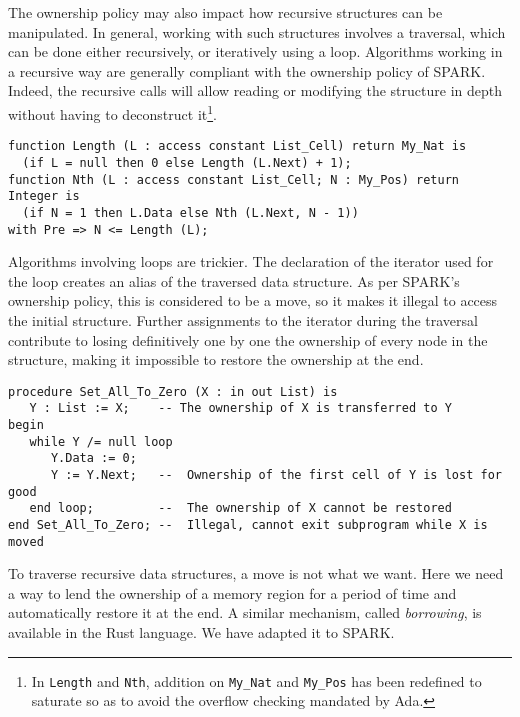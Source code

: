 \documentclass[runningheads]{llncs}
\begin{document}
The ownership policy may also impact how recursive structures can be manipulated. In general, working with such structures involves a traversal, which can be done either recursively, or iteratively using a loop. Algorithms working in a recursive way are generally compliant with the ownership policy of SPARK. Indeed, the recursive calls will allow reading or modifying the structure in depth without having to deconstruct it\footnote{In \texttt{Length} and \texttt{Nth}, addition on \texttt{My\_Nat} and \texttt{My\_Pos} has been redefined to saturate so as to avoid the overflow checking mandated by Ada.}.
\begin{lstlisting}
function Length (L : access constant List_Cell) return My_Nat is
  (if L = null then 0 else Length (L.Next) + 1);
function Nth (L : access constant List_Cell; N : My_Pos) return Integer is
  (if N = 1 then L.Data else Nth (L.Next, N - 1))
with Pre => N <= Length (L);
\end{lstlisting}
Algorithms involving loops are trickier. The declaration of the iterator used for the loop creates an alias of the traversed data structure. As per SPARK's ownership policy, this is considered to be a move, so it makes it illegal to access the initial structure. Further assignments to the iterator during the traversal contribute to losing definitively one by one the ownership of every node in the structure, making it impossible to restore the ownership at the end.
\begin{lstlisting}
procedure Set_All_To_Zero (X : in out List) is
   Y : List := X;    -- The ownership of X is transferred to Y
begin
   while Y /= null loop
      Y.Data := 0;
      Y := Y.Next;   --  Ownership of the first cell of Y is lost for good
   end loop;         --  The ownership of X cannot be restored
end Set_All_To_Zero; --  Illegal, cannot exit subprogram while X is moved
\end{lstlisting}
To traverse recursive data structures, a move is not what we want. Here we need a way to lend the ownership of a memory region for a period of time and automatically restore it at the end. A similar mechanism, called \emph{borrowing}, is available in the Rust language. We have adapted it to SPARK.
\end{document}
